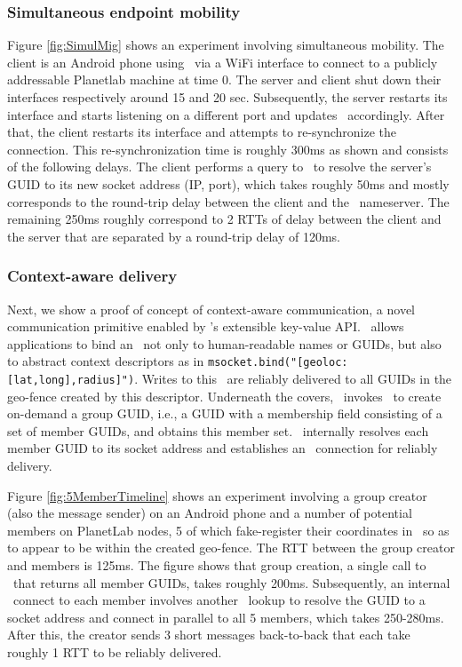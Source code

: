 \subsubsection{Simultaneous endpoint mobility}

Figure \ref{fig:SimulMig} shows an experiment involving simultaneous mobility. The client is an Android phone using \msocket\ via a WiFi interface to connect to a publicly addressable Planetlab machine at time 0. The server and client shut down their interfaces respectively around 15 and 20 sec. Subsequently, the server restarts its interface and starts listening on a different port and updates \auspice\ accordingly. After that, the client restarts its interface and attempts to re-synchronize the connection. This re-synchronization time is roughly 300ms as shown and consists of the following delays. The client performs a query to \auspice\ to resolve the server's GUID to its new socket address (IP, port), which takes roughly 50ms and mostly corresponds to the round-trip delay between the client and the \auspice\ nameserver. The remaining 250ms roughly correspond to 2 RTTs of delay between the client and the server that are separated by a round-trip delay of 120ms.

\subsubsection{Context-aware delivery}
\label{sec:context}

Next, we show a proof of concept of context-aware communication, a novel communication primitive enabled by \auspice's extensible key-value API. \auspice\ allows applications to bind an \msocket\ not only to human-readable names or GUIDs, but also to abstract context descriptors as in \verb+msocket.bind("[geoloc: [lat,long],radius]")+.  Writes to this \msocket\ are reliably delivered to all GUIDs in the geo-fence created by this descriptor. Underneath the covers, \msocket\ invokes \auspice\ to create on-demand a {group GUID}, i.e., a  GUID with a membership field consisting of a set of member GUIDs, and obtains this member set. \msocket\ internally resolves each member GUID to its socket address and establishes an \msocket\ connection for reliably delivery.

Figure \ref{fig:5MemberTimeline} shows an experiment involving a group creator (also the message sender) on an Android phone and a number of potential members on PlanetLab nodes, 5 of which fake-register their coordinates in \auspice\ so as to appear to be within the created geo-fence. The RTT between the group creator and members is 125ms. The figure shows that group creation, a single call to \auspice\ that returns all member GUIDs, takes roughly 200ms. Subsequently, an internal \msocket\ connect to each member involves another \auspice\ lookup to resolve the GUID to a socket address and connect in parallel to all 5 members, which takes 250-280ms. After this, the creator sends 3 short messages back-to-back that each take roughly 1 RTT to be reliably delivered.

